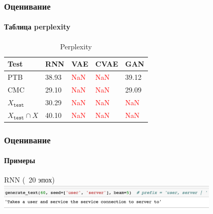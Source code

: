 \documentclass[10pt]{beamer}
\newcommand\TODO[1]{\textcolor{red}{{\Large TODO: #1}}}
\newcommand\NaN{\textcolor{red}{NaN}}
\begin{document}
\begin{frame}
\frametitle{Оценивание}
\framesubtitle{Таблица perplexity}

\begin{table}
\begin{tabular}{l | l l l l}
\toprule
\textbf{Test} & \textbf{RNN} & \textbf{VAE} & \textbf{CVAE} & \textbf{GAN} \\
\midrule
PTB & 38.93 & \NaN & \NaN & 39.12 \\
CMC & 29.10 & \NaN & \NaN & 29.09 \\
\midrule
$X_{\texttt{test}}$ & 30.29 & \NaN & \NaN & \NaN \\
$X_{\texttt{test}} \cap X$ & 40.10 & \NaN & \NaN & \NaN \\
\bottomrule
\end{tabular}
\caption{Perplexity}
\end{table}

\end{frame}
\begin{frame}
\frametitle{Оценивание}
\framesubtitle{Примеры}

\begin{center}
    RNN (~20 эпох) \\
    \includegraphics[width=0.8\textwidth]{images/example.png}
\end{center}


\end{frame}
\end{document}
